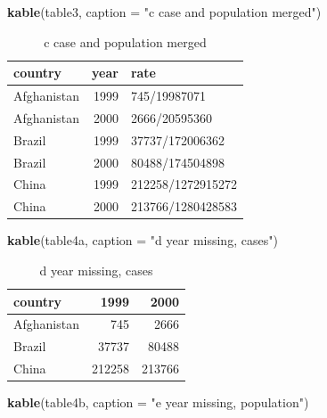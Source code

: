 \documentclass[]{book}
\newenvironment{Shaded}{\begin{snugshade}}{\end{snugshade}}
\newcommand{\KeywordTok}[1]{\textcolor[rgb]{0.13,0.29,0.53}{\textbf{#1}}}
\newcommand{\DataTypeTok}[1]{\textcolor[rgb]{0.13,0.29,0.53}{#1}}
\newcommand{\StringTok}[1]{\textcolor[rgb]{0.31,0.60,0.02}{#1}}
\newcommand{\NormalTok}[1]{#1}
\begin{document}
\begin{Shaded}
\begin{Highlighting}[]
\KeywordTok{kable}\NormalTok{(table3, }\DataTypeTok{caption =} \StringTok{"c case and population merged"}\NormalTok{)}
\end{Highlighting}
\end{Shaded}

\begin{table}[t]

\caption{\label{tab:unnamed-chunk-12}c case and population merged}
\centering
\begin{tabular}{l|r|l}
\hline
country & year & rate\\
\hline
Afghanistan & 1999 & 745/19987071\\
\hline
Afghanistan & 2000 & 2666/20595360\\
\hline
Brazil & 1999 & 37737/172006362\\
\hline
Brazil & 2000 & 80488/174504898\\
\hline
China & 1999 & 212258/1272915272\\
\hline
China & 2000 & 213766/1280428583\\
\hline
\end{tabular}
\end{table}

\begin{Shaded}
\begin{Highlighting}[]
\KeywordTok{kable}\NormalTok{(table4a, }\DataTypeTok{caption =} \StringTok{"d year missing, cases"}\NormalTok{)}
\end{Highlighting}
\end{Shaded}

\begin{table}[t]

\caption{\label{tab:unnamed-chunk-12}d year missing, cases}
\centering
\begin{tabular}{l|r|r}
\hline
country & 1999 & 2000\\
\hline
Afghanistan & 745 & 2666\\
\hline
Brazil & 37737 & 80488\\
\hline
China & 212258 & 213766\\
\hline
\end{tabular}
\end{table}

\begin{Shaded}
\begin{Highlighting}[]
\KeywordTok{kable}\NormalTok{(table4b, }\DataTypeTok{caption =} \StringTok{"e year missing, population"}\NormalTok{)}
\end{Highlighting}
\end{Shaded}
\end{document}
